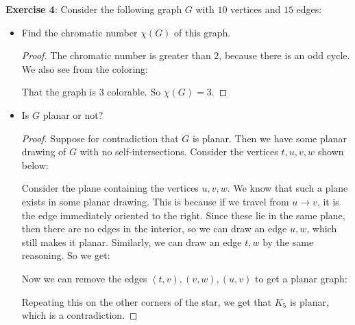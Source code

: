 \documentclass{article}
\begin{document}
\textbf{Exercise 4}: Consider the following graph $G$ with $10$ vertices and $15$ edges:
    \begin{fixedfigure}
    \end{fixedfigure}
    \begin{itemize}
        \item Find the chromatic number $\chi (G)$ of this graph.
            \begin{proof}
                The chromatic number is greater than $2$, because there is an odd cycle. We also see from the coloring:
                    \begin{fixedfigure}
                    \end{fixedfigure}
                That the graph is $3$ colorable. So $ \chi  ( G) = 3$.
            \end{proof}

        \item Is $G$ planar or not? 
            \begin{proof}
                Suppose for contradiction that $G$ is planar. Then we have some planar drawing of $G$ with no self-intersections. Consider the vertices $t, u, v, w$ shown below:
                    \begin{fixedfigure}
                    \end{fixedfigure}
                Consider the plane containing the vertices $u, v, w$. We know that such a plane exists in some planar drawing. This is because if we travel from $u \rightarrow v$, it is the edge immediately oriented to the right. Since these lie in the same plane, then there are no edges in the interior, so we can draw an edge $u, w$, which still makes it planar. Similarly, we can draw an edge $t, w$ by the same reasoning. So we get:
                    \begin{fixedfigure}
                    \end{fixedfigure}
                Now we can remove the edges $(t, v), (v, w), (u, v)$ to get a planar graph:
                    \begin{fixedfigure}
                    \end{fixedfigure}
                Repeating this on the other corners of the star, we get that $K_{5}$ is planar, which is a contradiction.
            \end{proof}
    \end{itemize}
\end{document}
